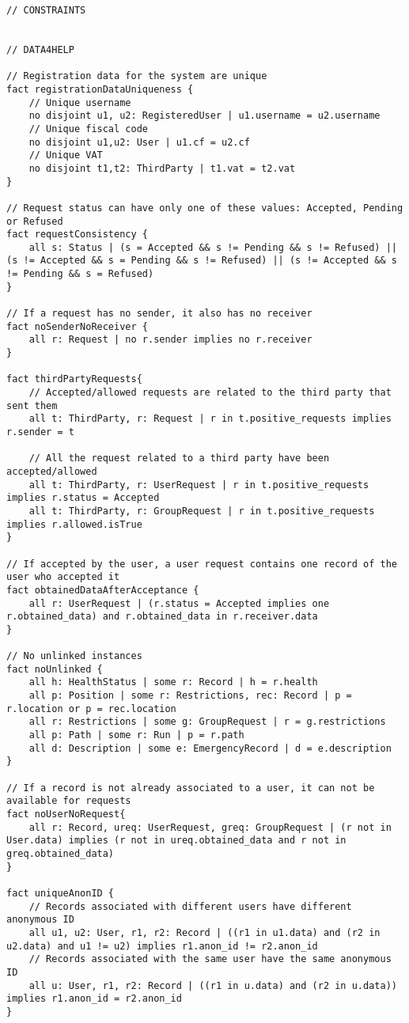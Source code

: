 \newpage

\begin{verbatim}
// CONSTRAINTS


// DATA4HELP

// Registration data for the system are unique
fact registrationDataUniqueness {
	// Unique username
	no disjoint u1, u2: RegisteredUser | u1.username = u2.username
	// Unique fiscal code
	no disjoint u1,u2: User | u1.cf = u2.cf
	// Unique VAT
	no disjoint t1,t2: ThirdParty | t1.vat = t2.vat
}

// Request status can have only one of these values: Accepted, Pending or Refused
fact requestConsistency {
	all s: Status | (s = Accepted && s != Pending && s != Refused) || (s != Accepted && s = Pending && s != Refused) || (s != Accepted && s != Pending && s = Refused) 
}

// If a request has no sender, it also has no receiver
fact noSenderNoReceiver {
	all r: Request | no r.sender implies no r.receiver
}

fact thirdPartyRequests{
	// Accepted/allowed requests are related to the third party that sent them
	all t: ThirdParty, r: Request | r in t.positive_requests implies r.sender = t

	// All the request related to a third party have been accepted/allowed
	all t: ThirdParty, r: UserRequest | r in t.positive_requests implies r.status = Accepted
	all t: ThirdParty, r: GroupRequest | r in t.positive_requests implies r.allowed.isTrue
}

// If accepted by the user, a user request contains one record of the user who accepted it
fact obtainedDataAfterAcceptance {
	all r: UserRequest | (r.status = Accepted implies one r.obtained_data) and r.obtained_data in r.receiver.data
}

// No unlinked instances
fact noUnlinked {
	all h: HealthStatus | some r: Record | h = r.health 
	all p: Position | some r: Restrictions, rec: Record | p = r.location or p = rec.location
	all r: Restrictions | some g: GroupRequest | r = g.restrictions
	all p: Path | some r: Run | p = r.path
	all d: Description | some e: EmergencyRecord | d = e.description
}

// If a record is not already associated to a user, it can not be available for requests
fact noUserNoRequest{
	all r: Record, ureq: UserRequest, greq: GroupRequest | (r not in User.data) implies (r not in ureq.obtained_data and r not in greq.obtained_data) 
}

fact uniqueAnonID {
	// Records associated with different users have different anonymous ID
	all u1, u2: User, r1, r2: Record | ((r1 in u1.data) and (r2 in u2.data) and u1 != u2) implies r1.anon_id != r2.anon_id
	// Records associated with the same user have the same anonymous ID
	all u: User, r1, r2: Record | ((r1 in u.data) and (r2 in u.data)) implies r1.anon_id = r2.anon_id
}


\end{verbatim}
